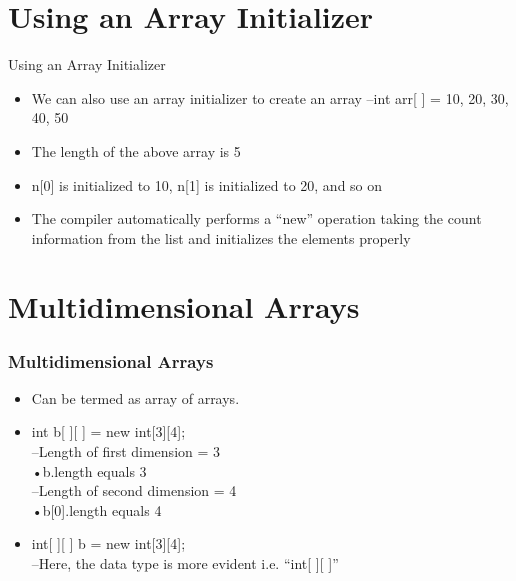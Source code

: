 \documentclass{beamer}
\begin{document}
\section{Using an Array Initializer}

\begin{frame}{Using an Array Initializer}
\begin{itemize}
\item We can also use an array initializer to create an array
–int arr[ ] = {10, 20, 30, 40, 50}\\
\item The length of the above array is 5
\item n[0] is initialized to 10, n[1] is initialized to 20, and so on\\
\item The compiler automatically performs a “new” operation taking the count information from the list and initializes the elements properly\\
\end{itemize}
\end{frame}


\section{Multidimensional Arrays}

\begin{frame}[fragile]
\frametitle{Multidimensional Arrays}
\begin{itemize}
\item Can be termed as array of arrays.\\
\item int b[ ][ ] = new int[3][4];\\
–Length of first dimension = 3\\
•b.length equals 3\\
–Length of second dimension = 4\\
•b[0].length equals 4\\
\item int[ ][ ] b = new int[3][4];\\
–Here, the data type is more evident i.e. “int[ ][ ]”\\
\end{itemize}
\end{frame}
\end{document}
